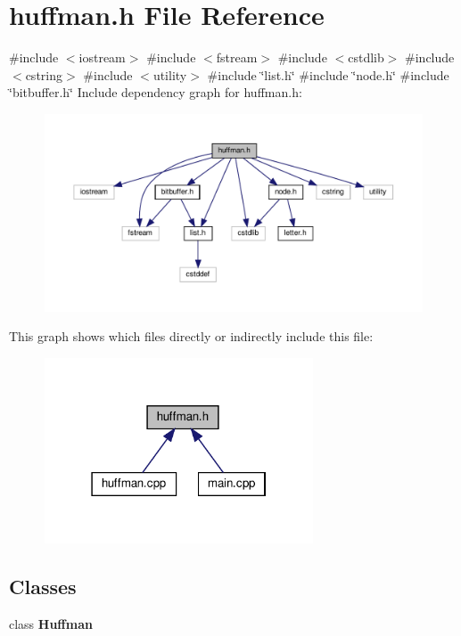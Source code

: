 \section{huffman.\+h File Reference}
\label{huffman_8h}
{\ttfamily \#include $<$iostream$>$}\newline
{\ttfamily \#include $<$fstream$>$}\newline
{\ttfamily \#include $<$cstdlib$>$}\newline
{\ttfamily \#include $<$cstring$>$}\newline
{\ttfamily \#include $<$utility$>$}\newline
{\ttfamily \#include \char`\"{}list.\+h\char`\"{}}\newline
{\ttfamily \#include \char`\"{}node.\+h\char`\"{}}\newline
{\ttfamily \#include \char`\"{}bitbuffer.\+h\char`\"{}}\newline
Include dependency graph for huffman.\+h\+:
\nopagebreak
\begin{figure}[H]
\begin{center}
\leavevmode
\includegraphics[width=350pt]{huffman_8h__incl}
\end{center}
\end{figure}
This graph shows which files directly or indirectly include this file\+:
\nopagebreak
\begin{figure}[H]
\begin{center}
\leavevmode
\includegraphics[width=226pt]{huffman_8h__dep__incl}
\end{center}
\end{figure}
\subsection*{Classes}
\begin{DoxyCompactItemize}
\item 
class \textbf{ Huffman}
\end{DoxyCompactItemize}

